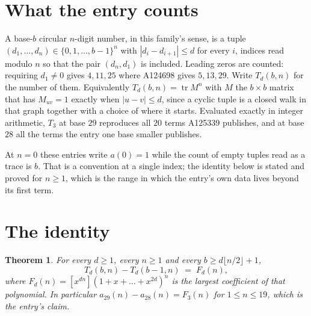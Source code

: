 \documentclass[11pt,a4paper]{article}
\theoremstyle{plain}
\newtheorem{theorem}{Theorem}
\theoremstyle{definition}
\begin{document}
\section{What the entry counts}

A base-$b$ circular $n$-digit number, in this family's sense, is a tuple
$(d_1,\dots,d_n)\in\{0,1,\dots,b-1\}^{n}$ with $|d_i-d_{i+1}|\le d$ for every $i$, indices
read modulo $n$ so that the pair $(d_n,d_1)$ is included. Leading zeros are counted: requiring
$d_1\ne0$ gives $4,11,25$ where A124698 gives $5,13,29$. Write $T_d(b,n)$ for the number of
them. Equivalently $T_d(b,n)=\operatorname{tr}M^{n}$ with $M$ the $b\times b$ matrix that has
$M_{uv}=1$ exactly when $|u-v|\le d$, since a cyclic tuple is a closed walk in that graph
together with a choice of where it starts. Evaluated exactly in integer arithmetic, $T_{3}$
at base $29$ reproduces all $20$ terms A125339 publishes, and at base $28$ all the
terms the entry one base smaller publishes.

At $n=0$ these entries write $a(0)=1$ while the count of empty tuples read as a trace is $b$.
That is a convention at a single index; the identity below is stated and proved for $n\ge1$,
which is the range in which the entry's own data lives beyond its first term.

\section{The identity}

\begin{theorem}
For every $d\ge1$, every $n\ge1$ and every $b\ge d\lfloor n/2\rfloor+1$,
\[
T_d(b,n)-T_d(b-1,n)\;=\;F_d(n),
\]
where $F_d(n)=[x^{dn}](1+x+\dots+x^{2d})^{n}$ is the largest coefficient of that
polynomial. In particular $a_{29}(n)-a_{28}(n)=F_{3}(n)$ for $1\le n\le19$, which
is the entry's claim.
\end{theorem}
\end{document}
